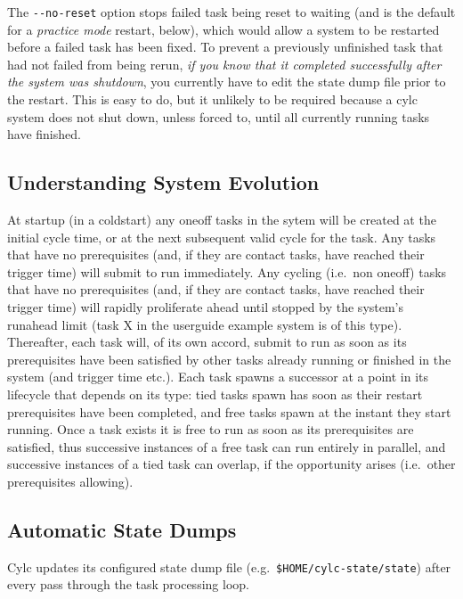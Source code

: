 \documentclass[11pt,a4paper]{article}
\begin{document}
The \lstinline=--no-reset= option stops failed task being reset to 
waiting (and is the default for a {\em practice mode} restart, below), 
which would allow a system to be restarted before a failed task has been
fixed. To prevent a previously unfinished task that had not failed from
being rerun, {\em if you know that it completed successfully after the
system was shutdown}, you currently have to edit the state dump file
prior to the restart.  This is easy to do, but it unlikely to be
required because a cylc system does not shut down, unless forced to, until
all currently running tasks have finished.


\subsection{Understanding System Evolution}
\label{UnderstandingSystemEvolution}

At startup (in a coldstart) any oneoff tasks in the sytem will be
created at the initial cycle time, or at the next subsequent valid cycle
for the task. Any tasks that have no prerequisites (and, if they are
contact tasks, have reached their trigger time) will submit to run
immediately. Any cycling (i.e.\ non oneoff) tasks that have no
prerequisites (and, if they are contact tasks, have reached their
trigger time) will rapidly proliferate ahead until stopped by the
system's runahead limit (task X in the userguide example system
is of this type).  Thereafter, each task will, of its own accord, submit
to run as soon as its prerequisites have been satisfied by other tasks
already running or finished in the system (and trigger time etc.). 
Each task spawns a successor at a point in its lifecycle that depends on
its type: tied tasks spawn has soon as their restart prerequisites have
been completed, and free tasks spawn at the instant they start running. 
Once a task exists it is free to run as soon as its prerequisites are
satisfied, thus successive instances of a free task can run entirely in
parallel, and successive instances of a tied task can overlap, 
if the opportunity arises (i.e.\ other prerequisites allowing).

\subsection{Automatic State Dumps}
\label{AutomaticStateDumps}

Cylc updates its configured state dump file (e.g.\
\lstinline=$HOME/cylc-state/state=) after every pass through the task 
processing loop.
\end{document}
